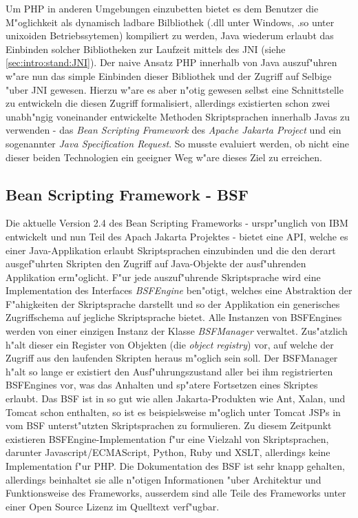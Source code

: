 Um PHP in anderen Umgebungen einzubetten bietet es dem Benutzer die M"oglichkeit als dynamisch ladbare
Bilbliothek (.dll unter Windows, .so unter unixoiden Betriebssytemen) kompiliert zu werden, Java wiederum
erlaubt das Einbinden solcher Bibliotheken zur Laufzeit mittels des JNI (siehe \ref{sec:intro:stand:JNI}).
Der naive Ansatz PHP innerhalb von Java auszuf"uhren w"are nun das simple Einbinden dieser Bibliothek und
der Zugriff auf Selbige "uber JNI gewesen. Hierzu w"are es aber n"otig gewesen selbst eine Schnittstelle 
zu entwickeln die diesen Zugriff formalisiert, allerdings existierten schon zwei unabh"ngig voneinander entwickelte
Methoden Skriptsprachen innerhalb Javas zu verwenden - das \emph{Bean Scripting Framework} des \emph{Apache
Jakarta Project} und ein sogenannter \emph{Java Specification Request}. So musste evaluiert werden, ob nicht
eine dieser beiden Technologien ein geeigner Weg w"are dieses Ziel zu erreichen. 

\subsection{Bean Scripting Framework - BSF}
\label{sec:chap1:ana:bsf}

Die aktuelle Version 2.4 des Bean Scripting Frameworks - urspr"unglich von IBM entwickelt und nun Teil des
Apach Jakarta Projektes \cite{BSFHP} - bietet eine API, welche es einer Java-Applikation erlaubt 
Skriptsprachen einzubinden und die den derart ausgef"uhrten Skripten den Zugriff auf Java-Objekte der ausf"uhrenden Applikation erm"oglicht.
F"ur jede auszuf"uhrende Skriptsprache wird eine Implementation des Interfaces \emph{BSFEngine} ben"otigt, welches eine
Abstraktion der F"ahigkeiten der Skriptsprache darstellt und so der Applikation ein generisches Zugriffschema
auf jegliche Skriptsprache bietet. Alle Instanzen von BSFEngines werden von einer einzigen Instanz der Klasse \emph{BSFManager} 
verwaltet. Zus"atzlich h"alt dieser ein Register von Objekten (die \emph{object registry}) vor, auf welche der Zugriff aus den 
laufenden Skripten heraus m"oglich sein soll. Der BSFManager h"alt so lange er existiert den Ausf"uhrungszustand aller bei 
ihm registrierten BSFEngines vor, was das Anhalten und sp"atere Fortsetzen eines Skriptes erlaubt.
Das BSF ist in so gut wie allen Jakarta-Produkten wie Ant, Xalan, und Tomcat schon enthalten, so ist es beispielsweise
m"oglich unter Tomcat JSPs in vom BSF unterst"utzten Skriptsprachen zu formulieren.
Zu diesem Zeitpunkt existieren BSFEngine-Implementation f"ur eine Vielzahl von Skriptsprachen, darunter Javascript/ECMAScript, 
Python, Ruby und XSLT, allerdings keine Implementation f"ur PHP. Die Dokumentation des BSF ist sehr knapp gehalten, allerdings
beinhaltet sie alle n"otigen Informationen "uber Architektur und Funktionsweise des Frameworks, ausserdem sind alle
Teile des Frameworks unter einer Open Source Lizenz im Quelltext verf"ugbar.

